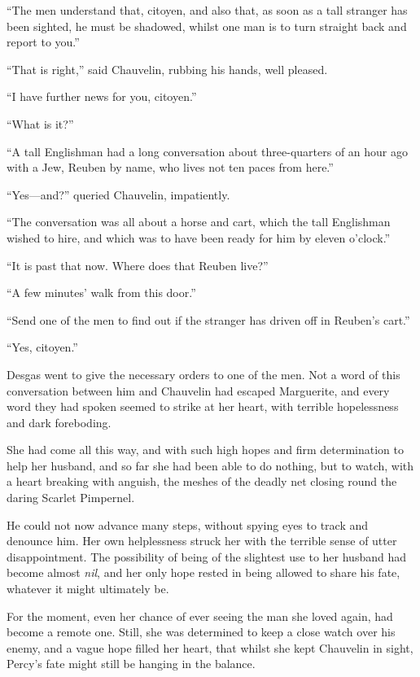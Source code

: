 \documentclass[paper=a5,BCOR=7mm,twoside,DIV=calc,12pt,usegeometry,chapterprefix,endperiod,headings=big]{scrbook}
\begin{document}
\enquote{The men understand that, citoyen, and also that, as soon as a tall stranger has been sighted, he must be shadowed, whilst one man is to turn straight back and report to you.}

\enquote{That is right,} said Chauvelin, rubbing his hands, well pleased.

\enquote{I have further news for you, citoyen.}

\enquote{What is it?}

\enquote{A tall Englishman had a long conversation about three-quarters of an hour ago with a Jew, Reuben by name, who lives not ten paces from here.}

\enquote{Yes---and?} queried Chauvelin, impatiently.

\enquote{The conversation was all about a horse and cart, which the tall Englishman wished to hire, and which was to have been ready for him by eleven o'clock.}

\enquote{It is past that now. Where does that Reuben live?}

\enquote{A few minutes’ walk from this door.}

\enquote{Send one of the men to find out if the stranger has driven off in Reuben's cart.}

\enquote{Yes, citoyen.}

Desgas went to give the necessary orders to one of the men. Not a word of this conversation between him and Chauvelin had escaped Marguerite, and every word they had spoken seemed to strike at her heart, with terrible hopelessness and dark foreboding.

She had come all this way, and with such high hopes and firm determination to help her husband, and so far she had been able to do nothing, but to watch, with a heart breaking with anguish, the meshes of the deadly net closing round the daring Scarlet Pimpernel.

He could not now advance many steps, without spying eyes to track and denounce him. Her own helplessness struck her with the terrible sense of utter disappointment. The possibility of being of the slightest use to her husband had become almost \textit{nil}, and her only hope rested in being allowed to share his fate, whatever it might ultimately be.

For the moment, even her chance of ever seeing the man she loved again, had become a remote one. Still, she was determined to keep a close watch over his enemy, and a vague hope filled her heart, that whilst she kept Chauvelin in sight, Percy's fate might still be hanging in the balance.
\end{document}
